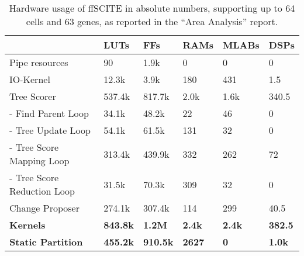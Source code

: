 \begin{table}
    \centering
    \begin{tabular}{l|l|l|l|l|l}
        &                           \textbf{LUTs}&      \textbf{FFs} &      \textbf{RAMs} & \textbf{MLABs} &    \textbf{DSPs} \\
        \hline
        Pipe resources &            90 &                1.9k &              0  &            0  &                0 	\\
        IO-Kernel &                 12.3k &             3.9k &              180 &           431 &               1.5 \\
        Tree Scorer &               537.4k &            817.7k &            2.0k &          1.6k &              340.5  \\
        - Find Parent Loop &        34.1k &         	48.2k &	            22 &            46 &                0 \\
        - Tree Update Loop &        54.1k &             61.5k &             131 &           32 &                0 \\
        - Tree Score Mapping Loop & 313.4k &            439.9k &            332 &           262 &               72 \\
        - Tree Score Reduction Loop& 31.5k &            70.3k &             309 &           32 &                0 \\
        Change Proposer &           274.1k &            307.4k &            114 &           299 &               40.5 \\
        \hline
        \textbf{Kernels} &          \textbf{843.8k} &   \textbf{1.2M} &     \textbf{2.4k} &	\textbf{2.4k} &     \textbf{382.5} \\
        \textbf{Static Partition} & \textbf{455.2k} &   \textbf{910.5k} &   \textbf{2627} &	\textbf{0} &        \textbf{1.0k}	
    \end{tabular}
    \caption{Hardware usage of \ac{ffSCITE} in absolute numbers, supporting up to 64 cells and 63 genes, as reported in the ``Area Analysis'' report.}
    \label{tab:abs-usage}
\end{table}

